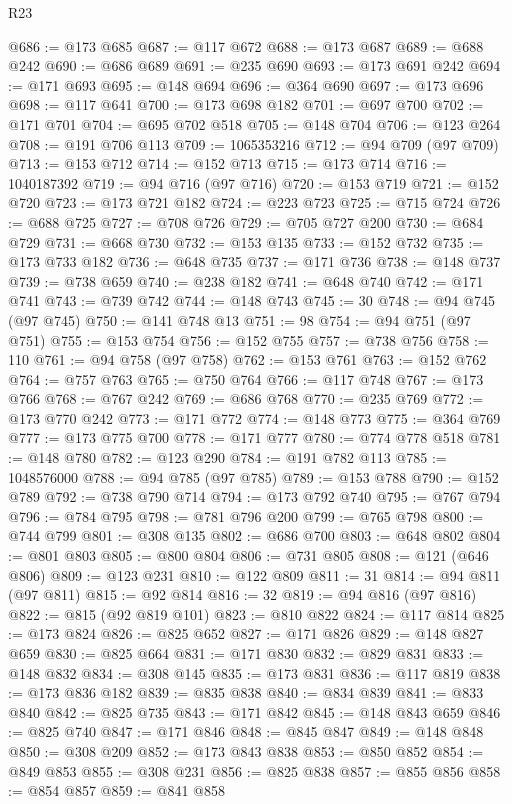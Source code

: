 \begin{lexlean}{R23}
\begin{coremodule}
@686 := @173 @685
@687 := @117 @672
@688 := @173 @687
@689 := @688 @242
@690 := @686 @689
@691 := @235 @690
@693 := @173 @691 @242
@694 := @171 @693
@695 := @148 @694
@696 := @364 @690
@697 := @173 @696
@698 := @117 @641
@700 := @173 @698 @182
@701 := @697 @700
@702 := @171 @701
@704 := @695 @702 @518
@705 := @148 @704
@706 := @123 @264
@708 := @191 @706 @113
@709 := 1065353216
@712 := @94 @709 (@97 @709)
@713 := @153 @712
@714 := @152 @713
@715 := @173 @714
@716 := 1040187392
@719 := @94 @716 (@97 @716)
@720 := @153 @719
@721 := @152 @720
@723 := @173 @721 @182
@724 := @223 @723
@725 := @715 @724
@726 := @688 @725
@727 := @708 @726
@729 := @705 @727 @200
@730 := @684 @729
@731 := @668 @730
@732 := @153 @135
@733 := @152 @732
@735 := @173 @733 @182
@736 := @648 @735
@737 := @171 @736
@738 := @148 @737
@739 := @738 @659
@740 := @238 @182
@741 := @648 @740
@742 := @171 @741
@743 := @739 @742
@744 := @148 @743
@745 := 30
@748 := @94 @745 (@97 @745)
@750 := @141 @748 @13
@751 := 98
@754 := @94 @751 (@97 @751)
@755 := @153 @754
@756 := @152 @755
@757 := @738 @756
@758 := 110
@761 := @94 @758 (@97 @758)
@762 := @153 @761
@763 := @152 @762
@764 := @757 @763
@765 := @750 @764
@766 := @117 @748
@767 := @173 @766
@768 := @767 @242
@769 := @686 @768
@770 := @235 @769
@772 := @173 @770 @242
@773 := @171 @772
@774 := @148 @773
@775 := @364 @769
@777 := @173 @775 @700
@778 := @171 @777
@780 := @774 @778 @518
@781 := @148 @780
@782 := @123 @290
@784 := @191 @782 @113
@785 := 1048576000
@788 := @94 @785 (@97 @785)
@789 := @153 @788
@790 := @152 @789
@792 := @738 @790 @714
@794 := @173 @792 @740
@795 := @767 @794
@796 := @784 @795
@798 := @781 @796 @200
@799 := @765 @798
@800 := @744 @799
@801 := @308 @135
@802 := @686 @700
@803 := @648 @802
@804 := @801 @803
@805 := @800 @804
@806 := @731 @805
@808 := @121 (@646 @806)
@809 := @123 @231
@810 := @122 @809
@811 := 31
@814 := @94 @811 (@97 @811)
@815 := @92 @814
@816 := 32
@819 := @94 @816 (@97 @816)
@822 := @815 (@92 @819 @101)
@823 := @810 @822
@824 := @117 @814
@825 := @173 @824
@826 := @825 @652
@827 := @171 @826
@829 := @148 @827 @659
@830 := @825 @664
@831 := @171 @830
@832 := @829 @831
@833 := @148 @832
@834 := @308 @145
@835 := @173 @831
@836 := @117 @819
@838 := @173 @836 @182
@839 := @835 @838
@840 := @834 @839
@841 := @833 @840
@842 := @825 @735
@843 := @171 @842
@845 := @148 @843 @659
@846 := @825 @740
@847 := @171 @846
@848 := @845 @847
@849 := @148 @848
@850 := @308 @209
@852 := @173 @843 @838
@853 := @850 @852
@854 := @849 @853
@855 := @308 @231
@856 := @825 @838
@857 := @855 @856
@858 := @854 @857
@859 := @841 @858

\end{coremodule}
\end{lexlean}
